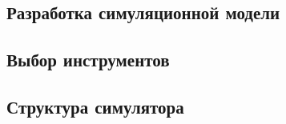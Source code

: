 \begin{center}
        \section{Разработка симуляционной модели}
        \subsection{Выбор инструментов}
\end{center}

\begin{center}
        \subsection{Структура симулятора}
\end{center}
